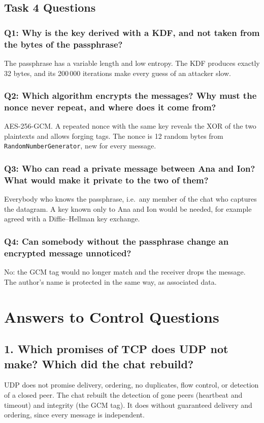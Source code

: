 \documentclass[11pt, a4paper]{article}
\begin{document}
\subsection{Task 4 Questions}
\subsubsection{Q1: Why is the key derived with a KDF, and not taken from the bytes of the passphrase?}
The passphrase has a variable length and low entropy. The KDF produces exactly 32 bytes, and its 200\,000 iterations make every guess of an attacker slow.

\subsubsection{Q2: Which algorithm encrypts the messages? Why must the nonce never repeat, and where does it come from?}
AES-256-GCM. A repeated nonce with the same key reveals the XOR of the two plaintexts and allows forging tags. The nonce is 12 random bytes from \texttt{RandomNumberGenerator}, new for every message.

\subsubsection{Q3: Who can read a private message between Ana and Ion? What would make it private to the two of them?}
Everybody who knows the passphrase, i.e.\ any member of the chat who captures the datagram. A key known only to Ana and Ion would be needed, for example agreed with a Diffie--Hellman key exchange.

\subsubsection{Q4: Can somebody without the passphrase change an encrypted message unnoticed?}
No: the GCM tag would no longer match and the receiver drops the message. The author's name is protected in the same way, as associated data.

\section{Answers to Control Questions}

\subsection{1. Which promises of TCP does UDP not make? Which did the chat rebuild?}
UDP does not promise delivery, ordering, no duplicates, flow control, or detection of a closed peer. The chat rebuilt the detection of gone peers (heartbeat and timeout) and integrity (the GCM tag). It does without guaranteed delivery and ordering, since every message is independent.
\end{document}
